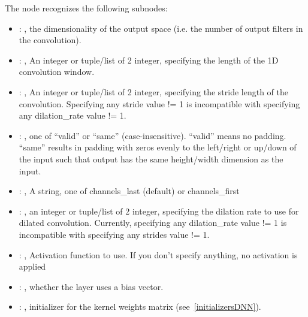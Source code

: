 \begin{itemize}
      The  node recognizes the following subnodes:
      \begin{itemize}
        \item {}: , 
          the dimensionality of the output space (i.e. the number of output filters in the
          convolution).

        \item {}: , 
          An integer or tuple/list of 2 integer, specifying the length of the 1D convolution window.

        \item {}: , 
          An integer or tuple/list of 2 integer, specifying the stride length of the convolution.
          Specifying any stride value != 1 is incompatible with specifying any dilation\_rate value
          != 1.

        \item {}: , 
          one of ``valid'' or ``same'' (case-insensitive). ``valid'' means no padding. ``same''
          results in padding         with zeros evenly to the left/right or up/down of the input
          such that output has the same height/width         dimension as the input.

        \item {}: , 
          A string, one of channels\_last (default) or channels\_first

        \item {}: , 
          an integer or tuple/list of 2 integer, specifying the dilation rate to use for dilated
          convolution. Currently, specifying any dilation\_rate value != 1 is incompatible with
          specifying any         strides value != 1.

        \item {}: , 
          Activation function to use. If you don't specify anything, no activation is applied

        \item {}: , 
          whether the layer uses a bias vector.

        \item {}: , 
          initializer for the kernel weights matrix (see~\ref{initializersDNN}).


\end{itemize}
\end{itemize}
